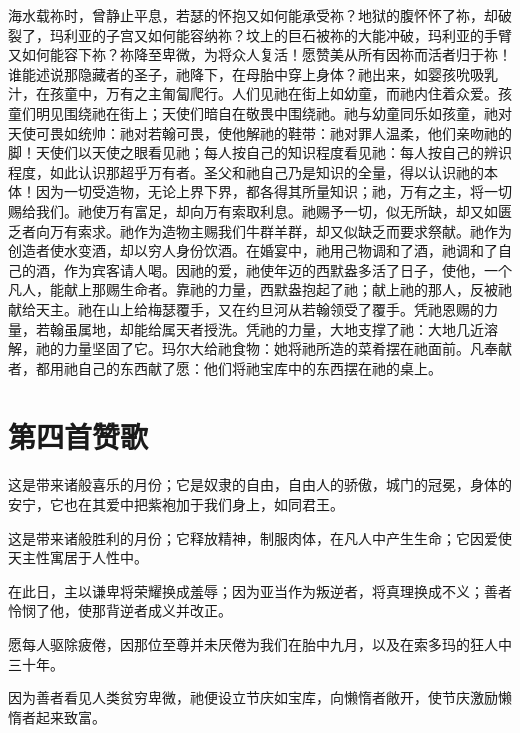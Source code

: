 海水载祢时，曾静止平息，若瑟的怀抱又如何能承受祢？地狱的腹怀怀了祢，却破裂了，玛利亚的子宫又如何能容纳祢？坟上的巨石被祢的大能冲破，玛利亚的手臂又如何能容下祢？祢降至卑微，为将众人复活！愿赞美从所有因祢而活者归于祢！谁能述说那隐藏者的圣子，祂降下，在母胎中穿上身体？祂出来，如婴孩吮吸乳汁，在孩童中，万有之主匍匐爬行。人们见祂在街上如幼童，而祂内住着众爱。孩童们明见围绕祂在街上；天使们暗自在敬畏中围绕祂。祂与幼童同乐如孩童，祂对天使可畏如统帅：祂对若翰可畏，使他解祂的鞋带：祂对罪人温柔，他们亲吻祂的脚！天使们以天使之眼看见祂；每人按自己的知识程度看见祂：每人按自己的辨识程度，如此认识那超乎万有者。圣父和祂自己乃是知识的全量，得以认识祂的本体！因为一切受造物，无论上界下界，都各得其所量知识；祂，万有之主，将一切赐给我们。祂使万有富足，却向万有索取利息。祂赐予一切，似无所缺，却又如匮乏者向万有索求。祂作为造物主赐我们牛群羊群，却又似缺乏而要求祭献。祂作为创造者使水变酒，却以穷人身份饮酒。在婚宴中，祂用己物调和了酒，祂调和了自己的酒，作为宾客请人喝。因祂的爱，祂使年迈的西默盎多活了日子，使他，一个凡人，能献上那赐生命者。靠祂的力量，西默盎抱起了祂；献上祂的那人，反被祂献给天主。祂在山上给梅瑟覆手，又在约旦河从若翰领受了覆手。凭祂恩赐的力量，若翰虽属地，却能给属天者授洗。凭祂的力量，大地支撑了祂：大地几近溶解，祂的力量坚固了它。玛尔大给祂食物：她将祂所造的菜肴摆在祂面前。凡奉献者，都用祂自己的东西献了愿：他们将祂宝库中的东西摆在祂的桌上。\par


\section{第四首赞歌}

这是带来诸般喜乐的月份；它是奴隶的自由，自由人的骄傲，城门的冠冕，身体的安宁，它也在其爱中把紫袍加于我们身上，如同君王。\par

这是带来诸般胜利的月份；它释放精神，制服肉体，在凡人中产生生命；它因爱使天主性寓居于人性中。\par

在此日，主以谦卑将荣耀换成羞辱；因为亚当作为叛逆者，将真理换成不义；善者怜悯了他，使那背逆者成义并改正。\par

愿每人驱除疲倦，因那位至尊并未厌倦为我们在胎中九月，以及在索多玛的狂人中三十年。\par

因为善者看见人类贫穷卑微，祂便设立节庆如宝库，向懒惰者敞开，使节庆激励懒惰者起来致富。\par

